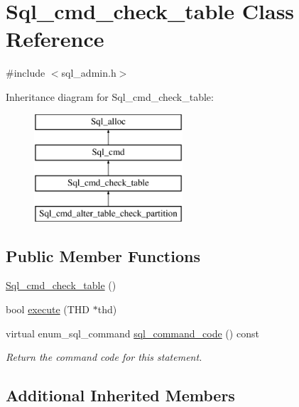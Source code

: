 \hypertarget{classSql__cmd__check__table}{}\section{Sql\+\_\+cmd\+\_\+check\+\_\+table Class Reference}
\label{classSql__cmd__check__table}


{\ttfamily \#include $<$sql\+\_\+admin.\+h$>$}

Inheritance diagram for Sql\+\_\+cmd\+\_\+check\+\_\+table\+:\begin{figure}[H]
\begin{center}
\leavevmode
\includegraphics[height=4.000000cm]{classSql__cmd__check__table}
\end{center}
\end{figure}
\subsection*{Public Member Functions}
\begin{DoxyCompactItemize}
\item 
\mbox{\hyperlink{classSql__cmd__check__table_aa9c39b9de353b9dc2a4edce4ec044fb3}{Sql\+\_\+cmd\+\_\+check\+\_\+table}} ()
\item 
bool \mbox{\hyperlink{classSql__cmd__check__table_a05c38a51158692165f18f7c16199c468}{execute}} (T\+HD $\ast$thd)
\item 
\mbox{\label{classSql__cmd__check__table_aba006f59684dd1b537ca66b164f0cb34}} 
virtual enum\+\_\+sql\+\_\+command \mbox{\hyperlink{classSql__cmd__check__table_aba006f59684dd1b537ca66b164f0cb34}{sql\+\_\+command\+\_\+code}} () const
\begin{DoxyCompactList}\small\item\em Return the command code for this statement. \end{DoxyCompactList}\end{DoxyCompactItemize}
\subsection*{Additional Inherited Members}


